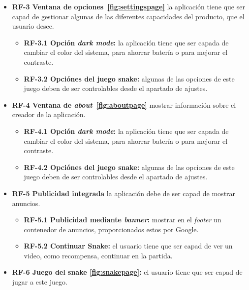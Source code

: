 \begin{itemize}
	\item \textbf{RF-3 Ventana de opciones~\ref{fig:settingspage}} la aplicación tiene que ser capad de gestionar algunas de las diferentes capacidades del producto, que el usuario desee.
	
	\begin{itemize}
		\tightlist
		\item \textbf{RF-3.1 Opción \emph{dark mode}:} la aplicación tiene que ser capada de cambiar el color del sistema, para ahorrar batería o para mejorar el contraste.
		\item \textbf{RF-3.2 Opciónes del juego snake:} algunas de las opciones de este juego deben de ser controlables desde el apartado de ajustes.
	\end{itemize}
	
	\item \textbf{RF-4 Ventana de \emph{about}~\ref{fig:aboutpage}} mostrar información sobre el creador de la aplicación.
	
	\begin{itemize}
		\tightlist
		\item \textbf{RF-4.1 Opción \emph{dark mode}:} la aplicación tiene que ser capada de cambiar el color del sistema, para ahorrar batería o para mejorar el contraste.
		\item \textbf{RF-4.2 Opciónes del juego snake:} algunas de las opciones de este juego deben de ser controlables desde el apartado de ajustes.
	\end{itemize}
	
	\item \textbf{RF-5 Publicidad integrada} la aplicación debe de ser capad de mostrar anuncios.
	
	\begin{itemize}
		\tightlist
		\item \textbf{RF-5.1 Publicidad mediante \emph{banner}:} mostrar en el \emph{footer} un contenedor de anuncios, proporcionados estos por Google.
		\item \textbf{RF-5.2 Continuar Snake:} el usuario tiene que ser capad de ver un video, como recompensa, continuar en la partida. 
	\end{itemize}

	\item \textbf{RF-6 Juego del snake \ref{fig:snakepage}:} el usuario tiene que ser capad de jugar a este juego.
	

\end{itemize}
